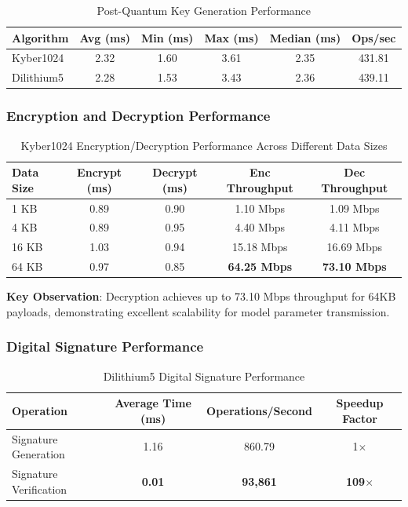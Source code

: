 \documentclass[12pt,a4paper]{article}
\begin{document}
\begin{table}[H]
\centering
\caption{Post-Quantum Key Generation Performance}
\begin{tabular}{lccccc}
\toprule
\textbf{Algorithm} & \textbf{Avg (ms)} & \textbf{Min (ms)} & \textbf{Max (ms)} & \textbf{Median (ms)} & \textbf{Ops/sec} \\
\midrule
Kyber1024 & 2.32 & 1.60 & 3.61 & 2.35 & 431.81 \\
Dilithium5 & 2.28 & 1.53 & 3.43 & 2.36 & 439.11 \\
\bottomrule
\end{tabular}
\end{table}

\subsubsection{Encryption and Decryption Performance}

\begin{table}[H]
\centering
\caption{Kyber1024 Encryption/Decryption Performance Across Different Data Sizes}
\begin{tabular}{lcccc}
\toprule
\textbf{Data Size} & \textbf{Encrypt (ms)} & \textbf{Decrypt (ms)} & \textbf{Enc Throughput} & \textbf{Dec Throughput} \\
\midrule
1 KB & 0.89 & 0.90 & 1.10 Mbps & 1.09 Mbps \\
4 KB & 0.89 & 0.95 & 4.40 Mbps & 4.11 Mbps \\
16 KB & 1.03 & 0.94 & 15.18 Mbps & 16.69 Mbps \\
64 KB & 0.97 & 0.85 & \textbf{64.25 Mbps} & \textbf{73.10 Mbps} \\
\bottomrule
\end{tabular}
\end{table}

\textbf{Key Observation}: Decryption achieves up to 73.10 Mbps throughput for 64KB payloads, demonstrating excellent scalability for model parameter transmission.

\subsubsection{Digital Signature Performance}

\begin{table}[H]
\centering
\caption{Dilithium5 Digital Signature Performance}
\begin{tabular}{lccc}
\toprule
\textbf{Operation} & \textbf{Average Time (ms)} & \textbf{Operations/Second} & \textbf{Speedup Factor} \\
\midrule
Signature Generation & 1.16 & 860.79 & 1$\times$ \\
Signature Verification & \textbf{0.01} & \textbf{93,861} & \textbf{109$\times$} \\
\bottomrule
\end{tabular}
\end{table}
\end{document}
